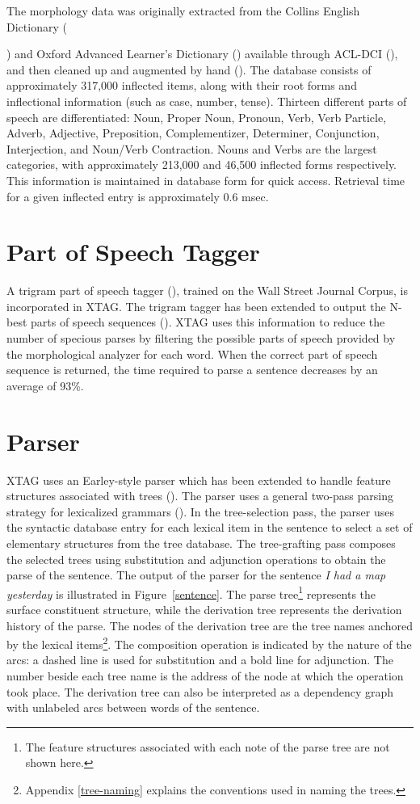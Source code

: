 The morphology data was originally extracted from the Collins English
Dictionary ({\cite{ced79}) and Oxford Advanced Learner's Dictionary
(\cite{oald74}) available through ACL-DCI (\cite{liberman89}), and then cleaned
up and augmented by hand (\cite{karp92}).  The database consists of
approximately 317,000 inflected items, along with their root forms and
inflectional information (such as case, number, tense).  Thirteen different
parts of speech are differentiated: Noun, Proper Noun, Pronoun, Verb, Verb
Particle, Adverb, Adjective, Preposition, Complementizer, Determiner,
Conjunction, Interjection, and Noun/Verb Contraction.  Nouns and Verbs are the
largest categories, with approximately 213,000 and 46,500 inflected forms
respectively.  This information is maintained in database form for quick
access.  Retrieval time for a given inflected entry is approximately 0.6 msec.

\section{Part of Speech Tagger}

A trigram part of speech tagger (\cite{kwc88}), trained on the Wall Street
Journal Corpus, is incorporated in XTAG. The trigram tagger has been extended
to output the N-best parts of speech sequences (\cite{soong90}).  XTAG uses
this information to reduce the number of specious parses by filtering the
possible parts of speech provided by the morphological analyzer for each word.
When the correct part of speech sequence is returned, the time required to
parse a sentence decreases by an average of 93\%.

\section{Parser}

XTAG uses an Earley-style parser which has been extended to handle
feature structures associated with trees (\cite{schabes90}). The parser uses a
general two-pass parsing strategy for lexicalized grammars (\cite{schabes88}).
In the tree-selection pass, the parser uses the syntactic database entry for
each lexical item in the sentence to select a set of elementary structures from
the tree database.  The tree-grafting pass composes the selected trees using
substitution and adjunction operations to obtain the parse of the sentence.
The output of the parser for the sentence {\it I had a map yesterday} is
illustrated in Figure~\ref{sentence}. The parse tree\footnote{The feature
structures associated with each note of the parse tree are not shown here.}
represents the surface constituent structure, while the derivation tree
represents the derivation history of the parse. The nodes of the derivation
tree are the tree names anchored by the lexical items\footnote{Appendix
\ref{tree-naming} explains the conventions used in naming the trees.}.  The
composition operation is indicated by the nature of the arcs: a dashed line is
used for substitution and a bold line for adjunction.  The number beside each
tree name is the address of the node at which the operation took place.  The
derivation tree can also be interpreted as a dependency graph with unlabeled
arcs between words of the sentence.

}
